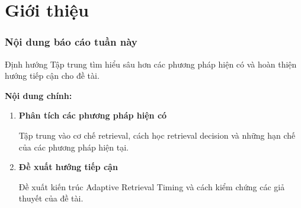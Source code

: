 
\section{Giới thiệu}

\begin{frame}
    \frametitle{Nội dung báo cáo tuần này}

    \begin{block}{Định hướng}
        Tập trung tìm hiểu sâu hơn các phương pháp hiện có
        và hoàn thiện hướng tiếp cận cho đề tài.
    \end{block}

    \vspace{0.45cm}

    \textbf{Nội dung chính:}

    \begin{enumerate}
        \item \textbf{Phân tích các phương pháp hiện có}

        \vspace{0.25cm}

        Tập trung vào cơ chế retrieval, cách học retrieval
        decision và những hạn chế của các phương pháp hiện tại.

        \vspace{0.3cm}

        \item \textbf{Đề xuất hướng tiếp cận}

        \vspace{0.25cm}

        Đề xuất kiến trúc Adaptive Retrieval Timing và
        cách kiểm chứng các giả thuyết của đề tài.
    \end{enumerate}

\end{frame}